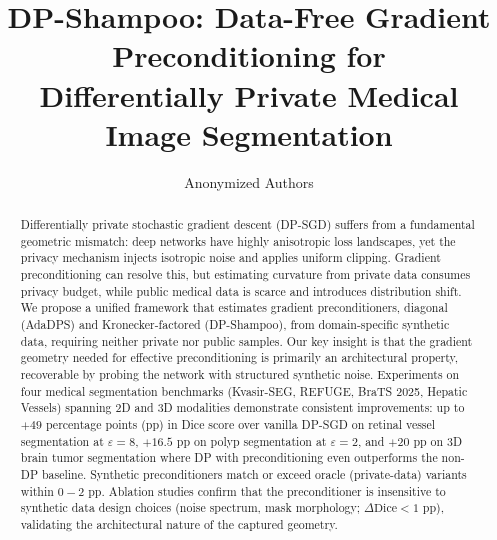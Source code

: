 \documentclass[runningheads]{llncs}
\begin{document}
\title{DP-Shampoo: Data-Free Gradient Preconditioning for\\ Differentially Private Medical Image Segmentation}

\author{Anonymized Authors}

\maketitle

\begin{abstract}
Differentially private stochastic gradient descent (DP-SGD) suffers from a fundamental geometric mismatch: deep networks have highly anisotropic loss landscapes, yet the privacy mechanism injects isotropic noise and applies uniform clipping. Gradient preconditioning can resolve this, but estimating curvature from private data consumes privacy budget, while public medical data is scarce and introduces distribution shift. We propose a unified framework that estimates gradient preconditioners, diagonal (AdaDPS) and Kronecker-factored (DP-Shampoo), from domain-specific synthetic data, requiring neither private nor public samples. Our key insight is that the gradient geometry needed for effective preconditioning is primarily an architectural property, recoverable by probing the network with structured synthetic noise. Experiments on four medical segmentation benchmarks (Kvasir-SEG, REFUGE, BraTS 2025, Hepatic Vessels) spanning 2D and 3D modalities demonstrate consistent improvements: up to $+49$ percentage points (pp) in Dice score over vanilla DP-SGD on retinal vessel segmentation at $\varepsilon{=}8$, $+16.5$ pp on polyp segmentation at $\varepsilon{=}2$, and $+20$ pp on 3D brain tumor segmentation where DP with preconditioning even outperforms the non-DP baseline. Synthetic preconditioners match or exceed oracle (private-data) variants within $0{-}2$ pp. Ablation studies confirm that the preconditioner is insensitive to synthetic data design choices (noise spectrum, mask morphology; $\Delta\text{Dice}{<}1$ pp), validating the architectural nature of the captured geometry.

\end{abstract}
\end{document}
